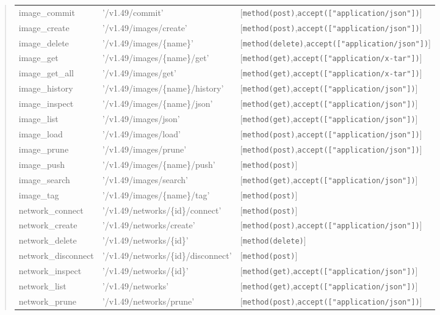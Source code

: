 \begin{description}
\begin{quote}
\begin{tabulary}{0.9\textwidth}{|l|L|L|}
image_commit & '/v1.49/commit' & [\verb$method(post)$,\verb$accept(["application/json"])$] \\
image_create & '/v1.49/images/create' & [\verb$method(post)$,\verb$accept(["application/json"])$] \\
image_delete & '/v1.49/images/\{name\}' & [\verb$method(delete)$,\verb$accept(["application/json"])$] \\
image_get & '/v1.49/images/\{name\}/get' & [\verb$method(get)$,\verb$accept(["application/x-tar"])$] \\
image_get_all & '/v1.49/images/get' & [\verb$method(get)$,\verb$accept(["application/x-tar"])$] \\
image_history & '/v1.49/images/\{name\}/history' & [\verb$method(get)$,\verb$accept(["application/json"])$] \\
image_inspect & '/v1.49/images/\{name\}/json' & [\verb$method(get)$,\verb$accept(["application/json"])$] \\
image_list & '/v1.49/images/json' & [\verb$method(get)$,\verb$accept(["application/json"])$] \\
image_load & '/v1.49/images/load' & [\verb$method(post)$,\verb$accept(["application/json"])$] \\
image_prune & '/v1.49/images/prune' & [\verb$method(post)$,\verb$accept(["application/json"])$] \\
image_push & '/v1.49/images/\{name\}/push' & [\verb$method(post)$] \\
image_search & '/v1.49/images/search' & [\verb$method(get)$,\verb$accept(["application/json"])$] \\
image_tag & '/v1.49/images/\{name\}/tag' & [\verb$method(post)$] \\
network_connect & '/v1.49/networks/\{id\}/connect' & [\verb$method(post)$] \\
network_create & '/v1.49/networks/create' & [\verb$method(post)$,\verb$accept(["application/json"])$] \\
network_delete & '/v1.49/networks/\{id\}' & [\verb$method(delete)$] \\
network_disconnect & '/v1.49/networks/\{id\}/disconnect' & [\verb$method(post)$] \\
network_inspect & '/v1.49/networks/\{id\}' & [\verb$method(get)$,\verb$accept(["application/json"])$] \\
network_list & '/v1.49/networks' & [\verb$method(get)$,\verb$accept(["application/json"])$] \\
network_prune & '/v1.49/networks/prune' & [\verb$method(post)$,\verb$accept(["application/json"])$] \\

\end{tabulary}
\end{quote}
\end{description}
